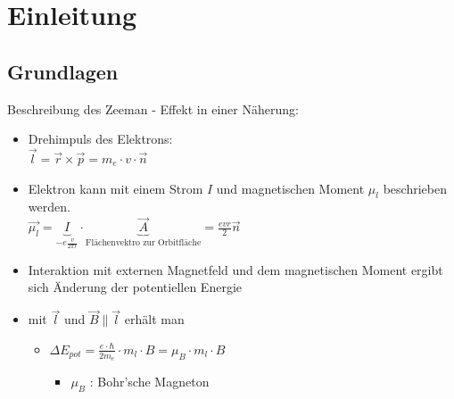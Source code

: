 
\section{Einleitung}


    \subsection{Grundlagen}
        \begin{myframe}{\subsecname}
            Beschreibung des Zeeman - Effekt in einer Näherung:
            \begin{itemize}
                \item Drehimpuls des Elektrons: \\ $\vec{l} = \vec{r} \times \vec{p} = m_e \cdot v \cdot \vec{n}$
                \item Elektron kann mit einem Strom $ I $ und magnetischen Moment $\mu_{l}$ beschrieben werden. \\
                $\vec{\mu_{l}} = \underbrace{I}_{- e \frac{v}{2 \pi r}} \cdot \underbrace{\vec{A}}_{\text{Flächenvektro zur Orbitfläche}} = \frac{evr}{2} \vec{n}$
                \item Interaktion mit externen Magnetfeld und dem magnetischen Moment ergibt sich Änderung der potentiellen Energie
                \item mit $\vec{l}$ und $\vec{B} \parallel \vec{l}$ erhält man
                \begin{itemize}
                    \item[] $\Delta E_{pot} = \frac{e \cdot \hbar}{2m_e} \cdot m_l \cdot B = \mu_B \cdot m_l \cdot B $
                    \begin{itemize}
                        \item[] $\mu_{B}$ : Bohr'sche Magneton
                    \end{itemize}
                \end{itemize}
            \end{itemize}
        \end{myframe}

